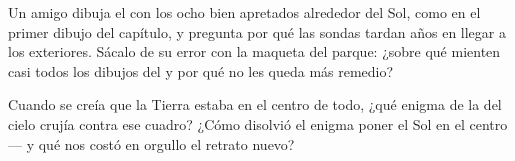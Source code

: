 \begin{exercise}[$\star\star$]\label{exo:g4:solar-system:10}
Un amigo dibuja el  con los ocho  bien
apretados alrededor del Sol, como en el primer dibujo del capítulo, y
pregunta por qué las sondas tardan años en llegar a los 
exteriores. Sácalo de su error con la maqueta del parque: ¿sobre qué
mienten casi todos los dibujos del  y por qué no les
queda más remedio?
\end{exercise}

\begin{exercise}[$\star\star$]\label{exo:g4:solar-system:11}
Cuando se creía que la Tierra estaba en el centro de todo, ¿qué enigma
de la  del cielo crujía contra ese cuadro? ¿Cómo disolvió
el enigma poner el Sol en el centro --- y qué nos costó en orgullo el
retrato nuevo?
\end{exercise}
